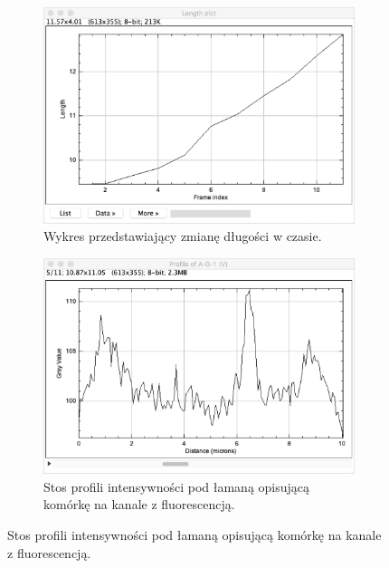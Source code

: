 \documentclass[declaration,shortabstract,mgr]{iithesis}
\begin{document}
\begin{figure}
  \centering

  \begin{subfigure}[t]{.45\textwidth}
    \centering
    \includegraphics[width=\textwidth]{images/ui-plot-lengths.png}
    \caption{\centering Wykres przedstawiający zmianę długości w czasie.}
  \end{subfigure}
  \hfill
  \begin{subfigure}[t]{.45\textwidth}
    \centering
    \includegraphics[width=\textwidth]{images/ui-plot-profiles.png}
    \caption{\centering Stos profili intensywności pod łamaną opisującą komórkę na kanale z fluorescencją.}
  \end{subfigure}
  \hfill

  \par\bigskip


\end{figure}
\end{document}
